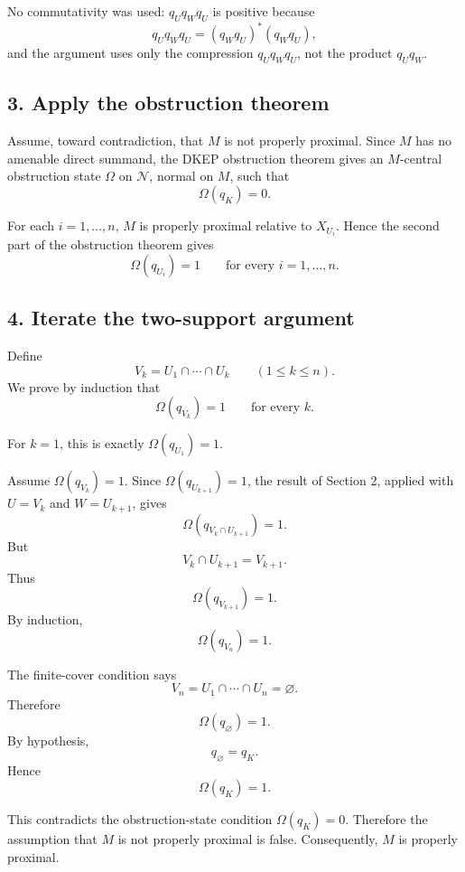 \documentclass[12pt]{article}
\begin{document}
No commutativity was used: \(q_Uq_Wq_U\) is positive because
\[
q_Uq_Wq_U=(q_Wq_U)^*(q_Wq_U),
\]
and the argument uses only the compression \(q_Uq_Wq_U\), not the product \(q_Uq_W\).

\subsection*{3. Apply the obstruction theorem}

Assume, toward contradiction, that \(M\) is not properly proximal. Since \(M\) has no amenable direct summand, the DKEP obstruction theorem gives an \(M\)-central obstruction state \(\Omega\) on \(\mathcal N\), normal on \(M\), such that
\[
\Omega(q_K)=0.
\]

For each \(i=1,\dots,n\), \(M\) is properly proximal relative to \(X_{U_i}\). Hence the second part of the obstruction theorem gives
\[
\Omega(q_{U_i})=1
\qquad\text{for every }i=1,\dots,n.
\]

\subsection*{4. Iterate the two-support argument}

Define
\[
V_k=U_1\cap\cdots\cap U_k
\qquad (1\le k\le n).
\]
We prove by induction that
\[
\Omega(q_{V_k})=1
\qquad\text{for every }k.
\]

For \(k=1\), this is exactly \(\Omega(q_{U_1})=1\).

Assume \(\Omega(q_{V_k})=1\). Since \(\Omega(q_{U_{k+1}})=1\), the result of Section 2, applied with \(U=V_k\) and \(W=U_{k+1}\), gives
\[
\Omega(q_{V_k\cap U_{k+1}})=1.
\]
But
\[
V_k\cap U_{k+1}=V_{k+1}.
\]
Thus
\[
\Omega(q_{V_{k+1}})=1.
\]
By induction,
\[
\Omega(q_{V_n})=1.
\]

The finite-cover condition says
\[
V_n=U_1\cap\cdots\cap U_n=\varnothing.
\]
Therefore
\[
\Omega(q_{\varnothing})=1.
\]
By hypothesis,
\[
q_{\varnothing}=q_K.
\]
Hence
\[
\Omega(q_K)=1.
\]

This contradicts the obstruction-state condition \(\Omega(q_K)=0\). Therefore the assumption that \(M\) is not properly proximal is false. Consequently, \(M\) is properly proximal.
\end{document}
